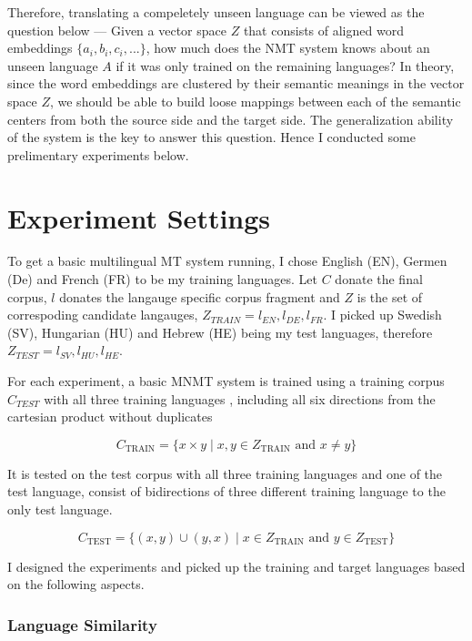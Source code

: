 \documentclass[thesis,fonts=libertine]{cluu}
\begin{document}
Therefore, translating a compeletely unseen language can be viewed as the question below --- Given a vector space $Z$ that consists of aligned word embeddings $\{a_i, b_i, c_i, ...\}$, how much does the NMT system knows about an unseen language $A$ if it was only trained on the remaining languages? In theory, since the word embeddings are clustered by their semantic meanings in the vector space $Z$, we should be able to build loose mappings between each of the semantic centers from both the source side and the target side. The generalization ability of the system is the key to answer this question. Hence I conducted some prelimentary experiments below.

\section{Experiment Settings}

To get a basic multilingual MT system running, I chose English (EN), Germen (De) and French (FR) to be my training languages. Let $C$ donate the final corpus, $l$ donates the langauge specific corpus fragment and $Z$ is the set of correspoding candidate langauges, $Z_{TRAIN} = {l_{EN}, l_{DE}, l_{FR}}$. I picked up Swedish (SV), Hungarian (HU) and Hebrew (HE) being my test languages, therefore $Z_{TEST} = {l_{SV}, l_{HU}, l_{HE}}$.

For each experiment, a basic MNMT system is trained using a training corpus  $C_{TEST}$ with all three training languages , including all six directions from the cartesian product without duplicates

\begin{equation}
  C_{\text{TRAIN}} = \{x \times y \mid x, y \in Z_{\text{TRAIN}} \text{ and } x \neq y\}
\end{equation}

It is tested on the test corpus with all three training languages and one of the test language, consist of bidirections of three different training language to the only test language.

\begin{equation}
  C_{\text{TEST}} = \{(x, y)\cup(y,x) \mid x \in Z_{\text{TRAIN}} \text{ and } y \in Z_{\text{TEST}}\}
\end{equation}

I designed the experiments and picked up the training and target languages based on the following aspects.

\subsubsection{Language Similarity}
\end{document}
